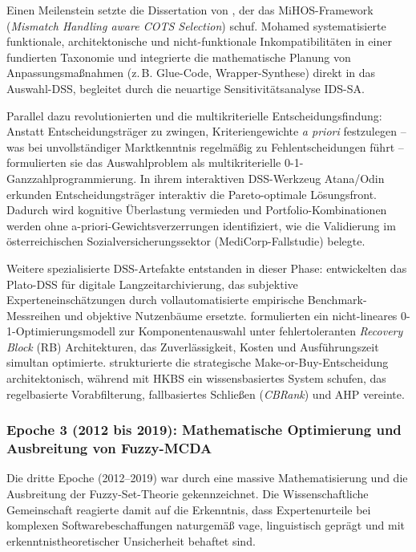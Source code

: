 Einen Meilenstein setzte die Dissertation von \textcite{9F79VAAB}, der das MiHOS-Framework (\textit{Mismatch Handling aware COTS Selection}) schuf. Mohamed systematisierte funktionale, architektonische und nicht-funktionale Inkompatibilitäten in einer fundierten Taxonomie und integrierte die mathematische Planung von Anpassungsmaßnahmen (z.\,B. Glue-Code, Wrapper-Synthese) direkt in das Auswahl-DSS, begleitet durch die neuartige Sensitivitätsanalyse IDS-SA.

Parallel dazu revolutionierten \textcite{ZQMG69VT} und \textcite{MZ8JHDYA} die multikriterielle Entscheidungsfindung: Anstatt Entscheidungsträger zu zwingen, Kriteriengewichte \textit{a priori} festzulegen -- was bei unvollständiger Marktkenntnis regelmäßig zu Fehlentscheidungen führt -- formulierten sie das Auswahlproblem als multikriterielle 0-1-Ganzzahlprogrammierung. In ihrem interaktiven DSS-Werkzeug Atana/Odin erkunden Entscheidungsträger interaktiv die Pareto-optimale Lösungsfront. Dadurch wird kognitive Überlastung vermieden und Portfolio-Kombinationen werden ohne a-priori-Gewichtsverzerrungen identifiziert, wie die Validierung im österreichischen Sozialversicherungssektor (MediCorp-Fallstudie) belegte.

Weitere spezialisierte DSS-Artefakte entstanden in dieser Phase: \textcite{8VHUMEKY} entwickelten das Plato-DSS für digitale Langzeitarchivierung, das subjektive Experteneinschätzungen durch vollautomatisierte empirische Benchmark-Messreihen und objektive Nutzenbäume ersetzte. \textcite{VUVLUN85} formulierten ein nicht-lineares 0-1-Optimierungsmodell zur Komponentenauswahl unter fehlertoleranten \textit{Recovery Block} (RB) Architekturen, das Zuverlässigkeit, Kosten und Ausführungszeit simultan optimierte. \textcite{WBGP3ETU} strukturierte die strategische Make-or-Buy-Entscheidung architektonisch, während \textcite{U4E7VXQU} mit HKBS ein wissensbasiertes System schufen, das regelbasierte Vorabfilterung, fallbasiertes Schließen (\textit{CBRank}) und AHP vereinte.

\subsubsection{Epoche 3 (2012 bis 2019): Mathematische Optimierung und Ausbreitung von Fuzzy-MCDA}
\label{subsubsec:epoche3}

Die dritte Epoche (2012--2019) war durch eine massive Mathematisierung und die Ausbreitung der Fuzzy-Set-Theorie gekennzeichnet. Die Wissenschaftliche Gemeinschaft reagierte damit auf die Erkenntnis, dass Expertenurteile bei komplexen Softwarebeschaffungen naturgemäß vage, linguistisch geprägt und mit erkenntnistheoretischer Unsicherheit behaftet sind.

